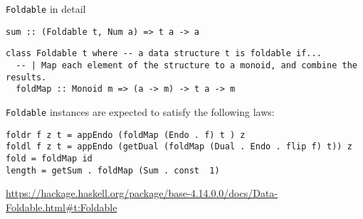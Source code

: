 \documentclass[8pt]{beamer}
\newcommand{\hs}[1]{\texttt{#1}}
\begin{document}
\begin{frame}[fragile]{\texttt{Foldable} in detail}

\hs{sum :: (Foldable t, Num a) => t a -> a}
\pause


\begin{verbatim}
class Foldable t where -- a data structure t is foldable if...
  -- | Map each element of the structure to a monoid, and combine the results.
  foldMap :: Monoid m => (a -> m) -> t a -> m
\end{verbatim}

\verb|Foldable| instances are expected to satisfy the following laws:

\begin{verbatim}
foldr f z t = appEndo (foldMap (Endo . f) t ) z
foldl f z t = appEndo (getDual (foldMap (Dual . Endo . flip f) t)) z
fold = foldMap id
length = getSum . foldMap (Sum . const  1)
\end{verbatim}
{\tiny \url{https://hackage.haskell.org/package/base-4.14.0.0/docs/Data-Foldable.html#t:Foldable}}
\end{frame}
\end{document}
